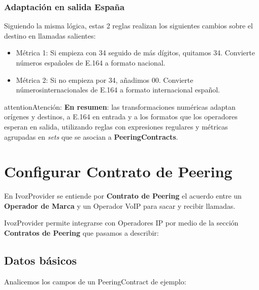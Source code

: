 \documentclass[letterpaper,10pt,spanish]{sphinxmanual}
\begin{document}
\subsubsection{Adaptación en salida España}
\label{external_incoming_calls/numeric_transformations:spanish-outgoing-transformation}
\noindent{}

Siguiendo la misma lógica, estas 2 reglas realizan los siguientes cambios sobre el destino en llamadas salientes:
\begin{itemize}
\item {} 
Métrica 1: Si empieza con 34 seguido de más dígitos, quitamos 34. Convierte números españoles de E.164 a formato nacional.

\item {} 
Métrica 2: Si no empieza por 34, añadimos 00. Convierte númerosinternacionales de E.164 a formato internacional español.

\end{itemize}

\begin{notice}{attention}{Atención:}
\textbf{En resumen}: las transformaciones numéricas adaptan orígenes y destinos, a E.164 en entrada y a los formatos que los operadores esperan en salida, utilizando reglas con expresiones regulares y métricas agrupadas en \emph{sets} que se asocian a \textbf{PeeringContracts}.
\end{notice}


\section{Configurar Contrato de Peering}
\label{external_incoming_calls/peering_contracts:configuring-a-peering-contract}\label{external_incoming_calls/peering_contracts::doc}\label{external_incoming_calls/peering_contracts:peering-contracts}
En IvozProvider se entiende por \textbf{Contrato de Peering} el acuerdo entre un \textbf{Operador de Marca} y un Operador VoIP para sacar y recibir llamadas.

IvozProvider permite integrarse con Operadores IP por medio de la sección \textbf{Contratos de Peering} que pasamos a describir:



\subsection{Datos básicos}
\label{external_incoming_calls/peering_contracts:peering-contract-basic-data}
Analicemos los campos de un PeeringContract de ejemplo:
\end{document}
